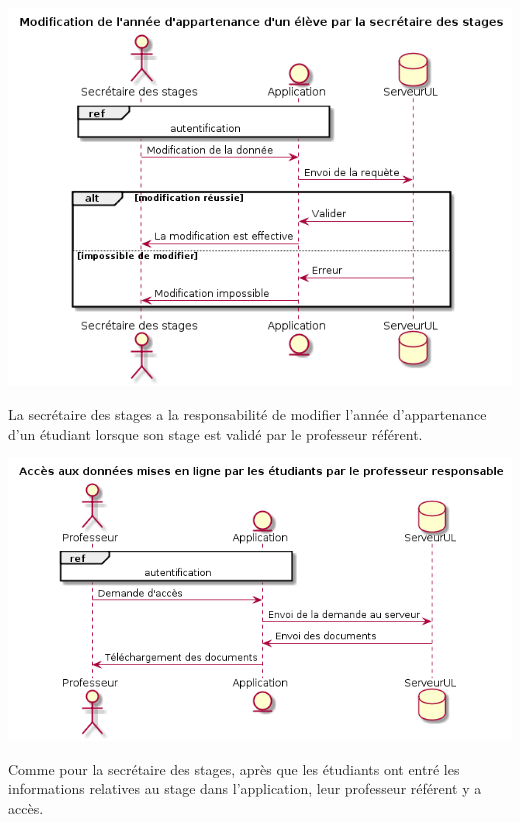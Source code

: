 \documentclass{scrreprt}
\begin{document}
\begin{center}
	\includegraphics[scale=0.55]{image/modifAnneeParSecretaire.png}
\end{center}
\hspace{1cm}La secrétaire des stages a la responsabilité de modifier l'année d'appartenance d'un étudiant lorsque son stage est validé par le professeur référent.

\begin{center}
	\includegraphics[scale=0.55]{image/accesDonneesParProfesseur.png}
\end{center}
\hspace{1cm}Comme pour la secrétaire des stages, après que les étudiants ont entré les informations relatives au stage dans l'application, leur professeur référent y a accès.
\end{document}
